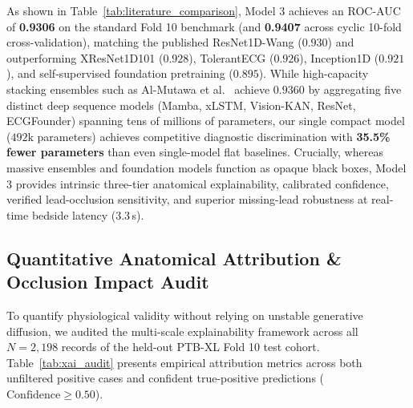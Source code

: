 \documentclass[12pt]{elsarticle}
\begin{document}
As shown in Table~\ref{tab:literature_comparison}, Model 3 achieves an ROC-AUC of \textbf{0.9306} on the standard Fold 10 benchmark (and \textbf{0.9407} across cyclic 10-fold cross-validation), matching the published ResNet1D-Wang ($0.930$) and outperforming XResNet1D101 ($0.928$), TolerantECG ($0.926$), Inception1D ($0.921$), and self-supervised foundation pretraining ($0.895$). While high-capacity stacking ensembles such as Al-Mutawa et al.~\cite{al2026stacking} achieve $0.9360$ by aggregating five distinct deep sequence models (Mamba, xLSTM, Vision-KAN, ResNet, ECGFounder) spanning tens of millions of parameters, our single compact model ($492\text{k}$ parameters) achieves competitive diagnostic discrimination with \textbf{35.5\% fewer parameters} than even single-model flat baselines. Crucially, whereas massive ensembles and foundation models function as opaque black boxes, Model 3 provides intrinsic three-tier anatomical explainability, calibrated confidence, verified lead-occlusion sensitivity, and superior missing-lead robustness at real-time bedside latency ($3.3$\,s).

\subsection{Quantitative Anatomical Attribution \& Occlusion Impact Audit}
\label{sec:attribution_audit}
To quantify physiological validity without relying on unstable generative diffusion, we audited the multi-scale explainability framework across all $N = 2,198$ records of the held-out PTB-XL Fold 10 test cohort. Table~\ref{tab:xai_audit} presents empirical attribution metrics across both unfiltered positive cases and confident true-positive predictions ($\text{Confidence} \ge 0.50$).
\end{document}
